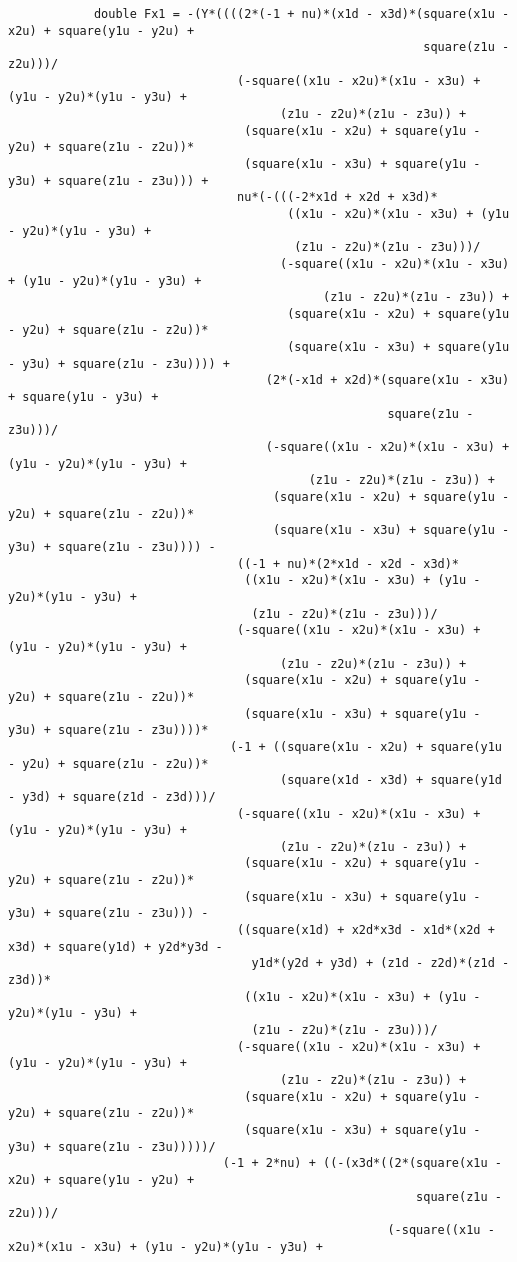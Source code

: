 \begin{lstlisting}
			double Fx1 = -(Y*((((2*(-1 + nu)*(x1d - x3d)*(square(x1u - x2u) + square(y1u - y2u) + 
														  square(z1u - z2u)))/
								(-square((x1u - x2u)*(x1u - x3u) + (y1u - y2u)*(y1u - y3u) + 
									  (z1u - z2u)*(z1u - z3u)) + 
								 (square(x1u - x2u) + square(y1u - y2u) + square(z1u - z2u))*
								 (square(x1u - x3u) + square(y1u - y3u) + square(z1u - z3u))) + 
								nu*(-(((-2*x1d + x2d + x3d)*
									   ((x1u - x2u)*(x1u - x3u) + (y1u - y2u)*(y1u - y3u) + 
										(z1u - z2u)*(z1u - z3u)))/
									  (-square((x1u - x2u)*(x1u - x3u) + (y1u - y2u)*(y1u - y3u) + 
											(z1u - z2u)*(z1u - z3u)) + 
									   (square(x1u - x2u) + square(y1u - y2u) + square(z1u - z2u))*
									   (square(x1u - x3u) + square(y1u - y3u) + square(z1u - z3u)))) + 
									(2*(-x1d + x2d)*(square(x1u - x3u) + square(y1u - y3u) + 
													 square(z1u - z3u)))/
									(-square((x1u - x2u)*(x1u - x3u) + (y1u - y2u)*(y1u - y3u) + 
										  (z1u - z2u)*(z1u - z3u)) + 
									 (square(x1u - x2u) + square(y1u - y2u) + square(z1u - z2u))*
									 (square(x1u - x3u) + square(y1u - y3u) + square(z1u - z3u)))) - 
								((-1 + nu)*(2*x1d - x2d - x3d)*
								 ((x1u - x2u)*(x1u - x3u) + (y1u - y2u)*(y1u - y3u) + 
								  (z1u - z2u)*(z1u - z3u)))/
								(-square((x1u - x2u)*(x1u - x3u) + (y1u - y2u)*(y1u - y3u) + 
									  (z1u - z2u)*(z1u - z3u)) + 
								 (square(x1u - x2u) + square(y1u - y2u) + square(z1u - z2u))*
								 (square(x1u - x3u) + square(y1u - y3u) + square(z1u - z3u))))*
							   (-1 + ((square(x1u - x2u) + square(y1u - y2u) + square(z1u - z2u))*
									  (square(x1d - x3d) + square(y1d - y3d) + square(z1d - z3d)))/
								(-square((x1u - x2u)*(x1u - x3u) + (y1u - y2u)*(y1u - y3u) + 
									  (z1u - z2u)*(z1u - z3u)) + 
								 (square(x1u - x2u) + square(y1u - y2u) + square(z1u - z2u))*
								 (square(x1u - x3u) + square(y1u - y3u) + square(z1u - z3u))) - 
								((square(x1d) + x2d*x3d - x1d*(x2d + x3d) + square(y1d) + y2d*y3d - 
								  y1d*(y2d + y3d) + (z1d - z2d)*(z1d - z3d))*
								 ((x1u - x2u)*(x1u - x3u) + (y1u - y2u)*(y1u - y3u) + 
								  (z1u - z2u)*(z1u - z3u)))/
								(-square((x1u - x2u)*(x1u - x3u) + (y1u - y2u)*(y1u - y3u) + 
									  (z1u - z2u)*(z1u - z3u)) + 
								 (square(x1u - x2u) + square(y1u - y2u) + square(z1u - z2u))*
								 (square(x1u - x3u) + square(y1u - y3u) + square(z1u - z3u)))))/
							  (-1 + 2*nu) + ((-(x3d*((2*(square(x1u - x2u) + square(y1u - y2u) + 
														 square(z1u - z2u)))/
													 (-square((x1u - x2u)*(x1u - x3u) + (y1u - y2u)*(y1u - y3u) + 

\end{lstlisting}
